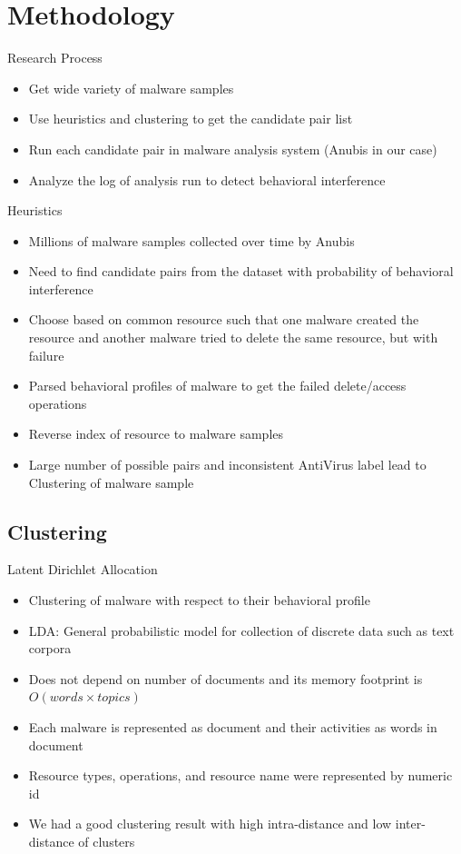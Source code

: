 \documentclass[]{beamer}
\begin{document}
\section{Methodology}
\label{sec:Methodology}
\begin{frame}[t]{Research Process}
\begin{itemize}
\item Get wide variety of malware samples
\item Use heuristics and clustering to get the candidate pair list
\item Run each candidate pair in malware analysis system (Anubis in our case)
\item Analyze the log of analysis run to detect behavioral interference
\end{itemize}
\begin{figure}[h]
    \centering
    \scalebox{0.5}{}
\end{figure}
\end{frame}
\begin{frame}[t]{Heuristics}
  \begin{itemize}
    \item Millions of malware samples collected over time by Anubis
    \item Need to find candidate pairs from the dataset with probability of behavioral interference
    \item Choose based on common resource such that one malware created the resource and another malware tried to delete the same resource, but with failure
    \item Parsed behavioral profiles of malware to get the failed delete/access operations
    \item Reverse index of resource to malware samples
    \item Large number of possible pairs and inconsistent AntiVirus label lead to Clustering of malware sample
  \end{itemize}
\end{frame}
\subsection{Clustering}
\label{sub:Clustering}
\begin{frame}[t]{Latent Dirichlet Allocation}
  \begin{itemize}
    \item Clustering of malware with respect to their behavioral profile
    \item LDA\@: General probabilistic model for collection of discrete data such as text corpora
    \item Does not depend on number of documents and its memory footprint is $O (words \times topics)$
    \item Each malware is represented as document and their activities as words in document
    \item Resource types, operations, and resource name were represented by numeric id
    \item We had a good clustering result with high intra-distance and low inter-distance of clusters
  \end{itemize}
\end{frame}
\end{document}
